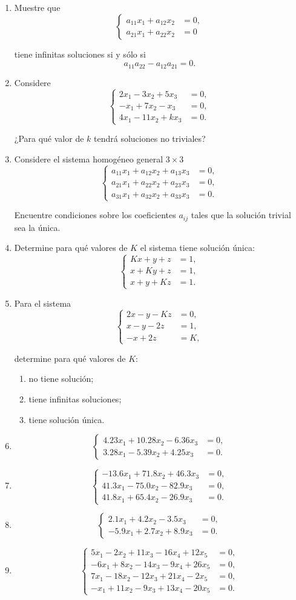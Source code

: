 \documentclass[12pt]{article}
\theoremstyle{remark}
\newcommand{\sistema}[1]{%
\[
\left\{
\begin{aligned}
#1
\end{aligned}
\right.
\]
}
\begin{document}
\begin{enumerate}[label=\textbf{H\arabic*.},start=21,leftmargin=*]
\item Muestre que
\sistema{a_{11}x_1+a_{12}x_2&=0,\\a_{21}x_1+a_{22}x_2&=0}
tiene infinitas soluciones si y sólo si
\[
a_{11}a_{22}-a_{12}a_{21}=0.
\]

\item Considere
\sistema{
2x_1-3x_2+5x_3&=0,\\
-x_1+7x_2-x_3&=0,\\
4x_1-11x_2+kx_3&=0.
}
¿Para qué valor de $k$ tendrá soluciones no triviales?

\item Considere el sistema homogéneo general $3\times3$
\sistema{
a_{11}x_1+a_{12}x_2+a_{13}x_3&=0,\\
a_{21}x_1+a_{22}x_2+a_{23}x_3&=0,\\
a_{31}x_1+a_{32}x_2+a_{33}x_3&=0.
}
Encuentre condiciones sobre los coeficientes $a_{ij}$ tales que la solución trivial sea la única.

\item Determine para qué valores de $K$ el sistema tiene solución única:
\sistema{
Kx+y+z&=1,\\
x+Ky+z&=1,\\
x+y+Kz&=1.
}

\item Para el sistema
\sistema{
2x-y-Kz&=0,\\
x-y-2z&=1,\\
-x+2z&=K,
}
determine para qué valores de $K$:
\begin{enumerate}[label=\alph*)]
\item no tiene solución;
\item tiene infinitas soluciones;
\item tiene solución única.
\end{enumerate}

\item \sistema{
4.23x_1+10.28x_2-6.36x_3&=0,\\
3.28x_1-5.39x_2+4.25x_3&=0.
}

\item \sistema{
-13.6x_1+71.8x_2+46.3x_3&=0,\\
41.3x_1-75.0x_2-82.9x_3&=0,\\
41.8x_1+65.4x_2-26.9x_3&=0.
}

\item \sistema{
2.1x_1+4.2x_2-3.5x_3&=0,\\
-5.9x_1+2.7x_2+8.9x_3&=0.
}

\item \sistema{
5x_1-2x_2+11x_3-16x_4+12x_5&=0,\\
-6x_1+8x_2-14x_3-9x_4+26x_5&=0,\\
7x_1-18x_2-12x_3+21x_4-2x_5&=0,\\
-x_1+11x_2-9x_3+13x_4-20x_5&=0.
}
\end{enumerate}
\end{document}
